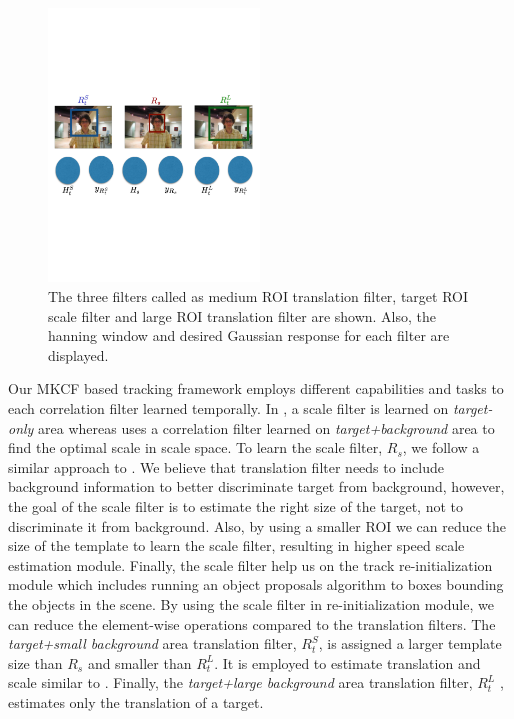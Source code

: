 \documentclass[10pt,twocolumn,letterpaper]{article}
\newcounter{ct}
\begin{document}
\begin{figure}[!t]
\includegraphics[width=0.5\textwidth]{figures/Filters_Details.pdf}
\caption{The three filters called as medium ROI translation filter,
  target ROI scale filter and large ROI translation filter are
  shown. Also, the hanning window and desired Gaussian response for
  each filter are displayed.}
\label{fig:Filters}
\end{figure}

Our MKCF based tracking framework employs different capabilities and
tasks to each correlation filter learned temporally. In
\cite{ma2015long, danelljan2014accurate}, a scale filter is learned on
\textit{target-only} area whereas \cite{henriques2015high,
  li2014scale, bibi2015multi, tang2015multi} uses a correlation filter
learned on \textit{target+background} area to find the optimal scale
in scale space. To learn the scale filter, $R_{s}$, we follow a
similar approach to \cite{ma2015long}. We believe that translation
filter needs to include background information to better discriminate
target from background, however, the goal of the scale filter is to
estimate the right size of the target, not to discriminate it from
background. Also, by using a smaller ROI we can reduce the size of the
template to learn the scale filter, resulting in higher speed scale
estimation module. Finally, the scale filter help us on the track
re-initialization module which includes running an object proposals
algorithm to boxes bounding the objects in the scene. By using the
scale filter in re-initialization module, we can reduce the
element-wise operations compared to the translation filters. The
\textit{target+small background} area translation filter, $R_{t}^{S}$,
is assigned a larger template size than $R_{s}$ and smaller than
$R_{t}^{L}$. It is employed to estimate translation and scale similar
to \cite{henriques2015high}. Finally, the \textit{target+large
  background} area translation filter, $R_{t}^{L}$ , estimates only
the translation of a target.
\end{document}
